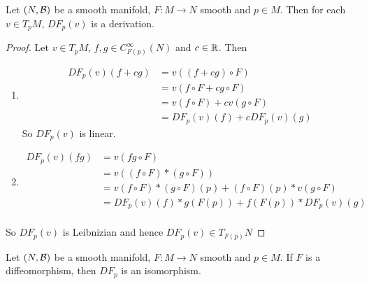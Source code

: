 \documentclass{book}
\begin{document}
	
	
	\begin{ex}
	Let $(N, \mathcal{B})$ be a smooth manifold, $F: M \rightarrow N$ smooth and $p \in M$. Then for each $v \in T_pM$, $DF_p(v)$ is a derivation.
	\end{ex}
	
	\begin{proof}
	Let $v \in T_pM$, $f,g \in C_{F(p)}^{\infty}(N)$ and $c \in \mathbb{R}$. Then 
	\begin{enumerate}
	\item 
	\begin{align*}
		DF_p(v)(f+cg) 
		&= v((f+cg) \circ F) \\
		&= v(f \circ F + c g \circ F) \\
		&= v(f \circ F) + cv(g \circ F) \\
		&= DF_p(v)(f) + c DF_p(v)(g)
	\end{align*}
	So $DF_p(v)$ is linear.
	\item 
	\begin{align*}
	DF_p(v)(fg) 
	&= v (fg \circ F) \\
	&= v((f \circ F)* (g \circ F)) \\
	&= v(f \circ F)*(g \circ F)(p) +  (f \circ F)(p)* v(g \circ F) \\
	&= DF_p(v)(f) * g(F(p)) + f(F(p))*DF_p(v)(g) \\
	\end{align*}
	\end{enumerate}
	So $DF_p(v)$ is Leibnizian and hence $DF_p(v) \in T_{F(p)}N$
	\end{proof}

	\begin{ex}
		Let $(N, \mathcal{B})$ be a smooth manifold, $F: M \rightarrow N$ smooth and $p \in M$. If $F$ is a diffeomorphism, then $DF_p$ is an isomorphism.
	\end{ex}
	
\end{document}
